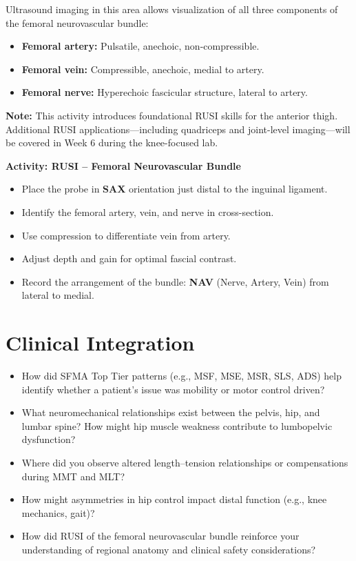 Ultrasound imaging in this area allows visualization of all three components of the femoral neurovascular bundle:
\begin{itemize}
  \item \textbf{Femoral artery:} Pulsatile, anechoic, non-compressible.
  \item \textbf{Femoral vein:} Compressible, anechoic, medial to artery.
  \item \textbf{Femoral nerve:} Hyperechoic fascicular structure, lateral to artery.
\end{itemize}

\textbf{Note:} This activity introduces foundational RUSI skills for the anterior thigh. Additional RUSI applications—including quadriceps and joint-level imaging—will be covered in Week 6 during the knee-focused lab.

\begin{labactivitybox}
\textbf{Activity: RUSI – Femoral Neurovascular Bundle}

\begin{itemize}
  \item Place the probe in \textbf{SAX} orientation just distal to the inguinal ligament.
  \item Identify the femoral artery, vein, and nerve in cross-section.
  \item Use compression to differentiate vein from artery.
  \item Adjust depth and gain for optimal fascial contrast.
  \item Record the arrangement of the bundle: \textbf{NAV} (Nerve, Artery, Vein) from lateral to medial.
\end{itemize}
\end{labactivitybox}

\section*{Clinical Integration}

\begin{itemize}
  \item How did SFMA Top Tier patterns (e.g., MSF, MSE, MSR, SLS, ADS) help identify whether a patient’s issue was mobility or motor control driven?
  \item What neuromechanical relationships exist between the pelvis, hip, and lumbar spine? How might hip muscle weakness contribute to lumbopelvic dysfunction?
  \item Where did you observe altered length–tension relationships or compensations during MMT and MLT?
  \item How might asymmetries in hip control impact distal function (e.g., knee mechanics, gait)?
  \item How did RUSI of the femoral neurovascular bundle reinforce your understanding of regional anatomy and clinical safety considerations?
\end{itemize}

